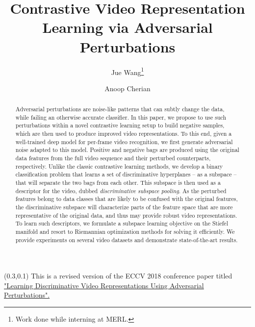 \documentclass[runningheads]{llncs}
\begin{document}
\begin{textblock}{13}(0.3,0.1)
\scriptsize {This is a revised version of the ECCV 2018 conference paper titled \newline \href{http://openaccess.thecvf.com/content_ECCV_2018/papers/Jue_Wang_Learning_Discriminative_Video_ECCV_2018_paper.pdf}{"Learning Discriminative Video Representations Using Adversarial Perturbations".}}
\end{textblock}

\title{Contrastive Video Representation Learning via Adversarial Perturbations} 




\author{Jue Wang\thanks{Work done while interning at MERL.}\and
Anoop Cherian}




\maketitle
\begin{abstract}
Adversarial perturbations are noise-like patterns that can subtly change the data, while failing an otherwise accurate classifier. In this paper, we propose to use such perturbations within a novel contrastive learning setup to build negative samples, which are then used to produce improved video representations. To this end, given a well-trained deep model for per-frame video recognition, we first generate adversarial noise adapted to this model. Positive and negative bags are produced using the original data features from the full video sequence and their perturbed counterparts, respectively. Unlike the classic contrastive learning methods, we develop a binary classification problem that learns a set of discriminative hyperplanes -- as a subspace -- that will separate the two bags from each other. This subspace is then used as a descriptor for the video, dubbed \emph{discriminative subspace pooling}. As the perturbed features belong to data classes that are likely to be confused with the original features, the discriminative subspace will characterize parts of the feature space that are more representative of the original data, and thus may provide robust video representations. To learn such descriptors, we formulate a subspace learning objective on the Stiefel manifold and resort to Riemannian optimization methods for solving it efficiently. We provide experiments on several video datasets and demonstrate state-of-the-art results.
\end{abstract}
\end{document}
